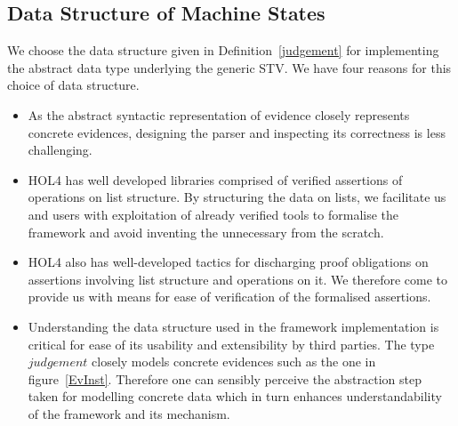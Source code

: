 \documentclass[10pt,conference]{IEEEtran}
\newtheorem{definition}{Definition}
\begin{document}
\subsection{Data Structure of Machine States}
\label{MachineData}
 We choose the data structure  given in Definition~\ref{judgement} for implementing the abstract data type underlying the generic STV.  We have four reasons for this choice of data structure. 
 \begin{itemize}
\item As the abstract syntactic representation of evidence closely represents concrete evidences, designing the parser and inspecting  its  correctness is less challenging.  
 \item HOL4 has well developed libraries comprised of verified assertions of operations on list structure. By structuring the data on lists, we facilitate us and users  with exploitation of  already verified tools to formalise the framework and avoid inventing the unnecessary from the scratch. 
 \item HOL4 also has well-developed tactics for discharging proof obligations on assertions involving list structure and operations on it. We therefore come to provide us with means for ease of verification of the formalised assertions.
 \item Understanding the data structure used in the  framework implementation is critical for ease of  its usability and extensibility by third parties.  The type $\mathit{judgement}$ closely models concrete evidences such as the one in figure~\ref{EvInst}. Therefore one can sensibly perceive the  abstraction step taken for modelling  concrete data which in turn enhances understandability of the framework and its mechanism. 
   \end{itemize}
\end{document}
